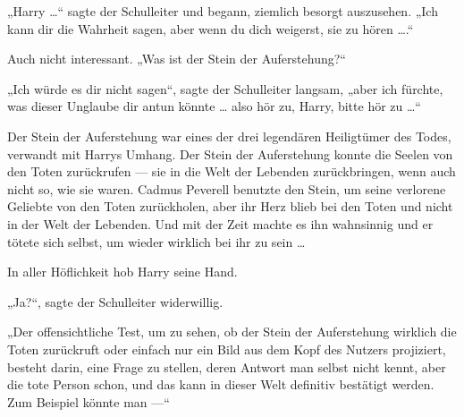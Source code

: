 „Harry …“ sagte der Schulleiter und begann, ziemlich besorgt auszusehen.
„Ich kann dir die Wahrheit sagen, aber wenn du dich weigerst, sie zu hören ….“

Auch nicht interessant.
„Was ist der Stein der Auferstehung?“

„Ich würde es dir nicht sagen“, sagte der Schulleiter langsam, „aber ich fürchte, was dieser Unglaube dir antun könnte … also hör zu, Harry, bitte hör zu …“

Der Stein der Auferstehung war eines der drei legendären Heiligtümer des Todes, verwandt mit Harrys Umhang. Der Stein der Auferstehung konnte die Seelen von den Toten zurückrufen — sie in die Welt der Lebenden zurückbringen, wenn auch nicht so, wie sie waren. Cadmus Peverell benutzte den Stein, um seine verlorene Geliebte von den Toten zurückholen, aber ihr Herz blieb bei den Toten und nicht in der Welt der Lebenden. Und mit der Zeit machte es ihn wahnsinnig und er tötete sich selbst, um wieder wirklich bei ihr zu sein …

In aller Höflichkeit hob Harry seine Hand.

„Ja?“, sagte der Schulleiter widerwillig.

„Der offensichtliche Test, um zu sehen, ob der Stein der Auferstehung wirklich die Toten zurückruft oder einfach nur ein Bild aus dem Kopf des Nutzers projiziert, besteht darin, eine Frage zu stellen, deren Antwort man selbst nicht kennt, aber die tote Person schon, und das kann in dieser Welt definitiv bestätigt werden. Zum Beispiel könnte man —“

